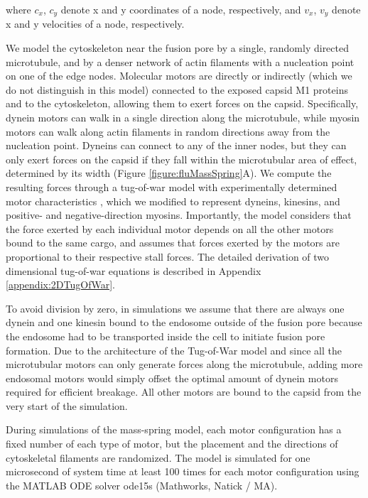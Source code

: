 where $c_x$, $c_y$ denote x and y coordinates of a node, respectively, and $v_x$, $v_y$ denote x and y velocities of a node, respectively. 

We model the cytoskeleton near the fusion pore by a single, randomly directed microtubule, and by a denser network of actin filaments with a nucleation point on one of the edge nodes. Molecular motors are directly or indirectly (which we do not distinguish in this model) connected to the exposed capsid M1 proteins and to the cytoskeleton, allowing them to exert forces on the capsid. Specifically, dynein motors can walk in a single direction along the microtubule, while myosin motors can walk along actin filaments in random directions away from the nucleation point. Dyneins can connect to any of the inner nodes, but they can only exert forces on the capsid if they fall within the microtubular area of effect, determined by its width (Figure \ref{figure:fluMassSpring}A).
We compute the resulting forces through a tug-of-war model with experimentally determined motor characteristics \cite{gennerich2007force, muller2008tug, norstrom2010unconventional}, which we modified to represent dyneins, kinesins, and positive- and negative-direction myosins. Importantly, the model considers that the force exerted by each individual motor depends on all the other motors bound to the same cargo, and assumes that forces exerted by the motors are proportional to their respective stall forces. The detailed derivation of two dimensional tug-of-war equations is described in Appendix \ref{appendix:2DTugOfWar}.
 
To avoid division by zero, in simulations we assume that there are always one dynein and one kinesin bound to the endosome outside of the fusion pore because the endosome had to be transported inside the cell to initiate fusion pore formation. Due to the architecture of the Tug-of-War model and since all the microtubular motors can only generate forces along the microtubule, adding more endosomal motors would simply offset the optimal amount of dynein motors required for efficient breakage. All other motors are bound to the capsid from the very start of the simulation.
 
During simulations of the mass-spring model, each motor configuration has a fixed number of each type of motor, but the placement and the directions of cytoskeletal filaments are randomized. The model is simulated for one microsecond of system time at least 100 times for each motor configuration using the MATLAB ODE solver ode15s (Mathworks, Natick / MA).

